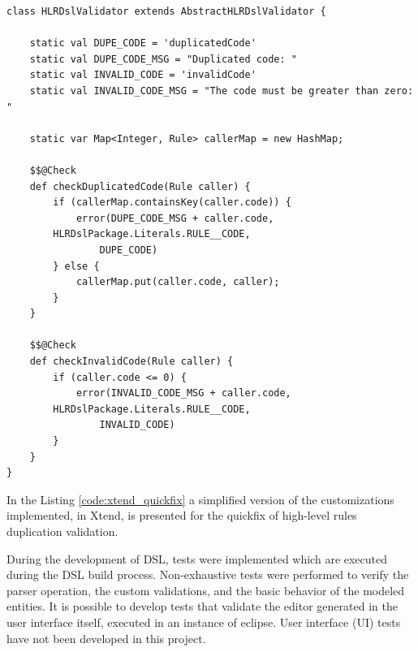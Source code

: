 \documentclass[AMA,STIX1COL,hidelinks]{WileyNJD-v2}
\begin{document}
\begin{lstlisting}[frame=single, language=Xtend, caption={\it Validation Customization}, label={code:xtend_validation}]
class HLRDslValidator extends AbstractHLRDslValidator {

	static val DUPE_CODE = 'duplicatedCode'
	static val DUPE_CODE_MSG = "Duplicated code: "
	static val INVALID_CODE = 'invalidCode'
	static val INVALID_CODE_MSG = "The code must be greater than zero: "
	
	static var Map<Integer, Rule> callerMap = new HashMap;

	$$@Check
	def checkDuplicatedCode(Rule caller) {
		if (callerMap.containsKey(caller.code)) {
			error(DUPE_CODE_MSG + caller.code, 
        HLRDslPackage.Literals.RULE__CODE, 
				DUPE_CODE)
		} else {
			callerMap.put(caller.code, caller);
		}
	}

	$$@Check
	def checkInvalidCode(Rule caller) {
		if (caller.code <= 0) {
			error(INVALID_CODE_MSG + caller.code, 
        HLRDslPackage.Literals.RULE__CODE,
				INVALID_CODE)
		}
	}
}	
\end{lstlisting}



In the Listing \ref{code:xtend_quickfix} a simplified version of the customizations implemented, in Xtend, is presented for the quickfix of high-level rules duplication validation.





During the development of DSL, tests were implemented which are executed during the DSL build process. Non-exhaustive tests were performed to verify the parser operation, the custom validations, and the basic behavior of the modeled entities. It is possible to develop tests that validate the editor generated in the user interface itself, executed in an instance of eclipse. User interface (UI) tests have not been developed in this project.
\end{document}
